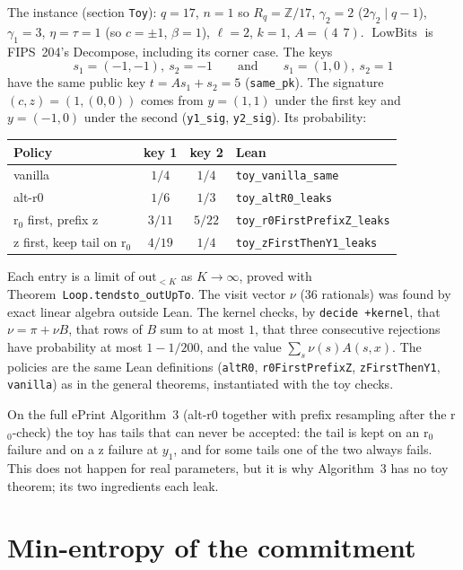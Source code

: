\documentclass[11pt]{article}
\theoremstyle{definition}
\theoremstyle{remark}
\newcommand{\Z}{\mathbb{Z}}
\newcommand{\lowbits}{\operatorname{LowBits}}
\newcommand{\lean}[1]{\texttt{#1}}
\begin{document}
The instance (section \lean{Toy}): $q=17$, $n=1$ so $R_q = \Z/17$, $\gamma_2 = 2$
($2\gamma_2 \mid q-1$), $\gamma_1 = 3$, $\eta=\tau=1$ (so $c=\pm1$, $\beta = 1$), $\ell=2$,
$k=1$, $A = (4\ \ 7)$. $\lowbits$ is FIPS~204's \textsf{Decompose}, including its corner case.
The keys
\[
  s_1 = (-1,-1),\ s_2 = -1 \qquad\text{and}\qquad s_1 = (1,0),\ s_2 = 1
\]
have the same public key $t = As_1 + s_2 = 5$ (\lean{same\_pk}). The signature
$(c,z) = (1,(0,0))$ comes from $y=(1,1)$ under the first key and $y=(-1,0)$ under the second
(\lean{y1\_sig}, \lean{y2\_sig}). Its probability:

\begin{center}
\begin{tabular}{@{}lccl@{}}
\toprule
Policy & key 1 & key 2 & Lean\\
\midrule
vanilla & $1/4$ & $1/4$ & \lean{toy\_vanilla\_same}\\
alt-r0 & $1/6$ & $1/3$ & \lean{toy\_altR0\_leaks}\\
r$_0$ first, prefix z & $3/11$ & $5/22$ & \lean{toy\_r0FirstPrefixZ\_leaks}\\
z first, keep tail on r$_0$ & $4/19$ & $1/4$ & \lean{toy\_zFirstThenY1\_leaks}\\
\bottomrule
\end{tabular}
\end{center}

Each entry is a limit of $\mathrm{out}_{<K}$ as $K\to\infty$, proved with
Theorem~\lean{Loop.tendsto\_outUpTo}. The visit vector $\nu$ (36 rationals) was found by exact
linear algebra outside Lean. The kernel checks, by \lean{decide +kernel}, that $\nu = \pi + \nu B$,
that rows of $B$ sum to at most $1$, that three consecutive rejections have probability at most
$1 - 1/200$, and the value $\sum_s \nu(s)A(s,x)$. The policies are the same Lean definitions
(\lean{altR0}, \lean{r0FirstPrefixZ}, \lean{zFirstThenY1}, \lean{vanilla}) as in the general
theorems, instantiated with the toy checks.

On the full ePrint Algorithm~3 (alt-r0 together with prefix resampling after the r$_0$-check)
the toy has tails that can never be accepted: the tail is kept on an r$_0$ failure and on a z
failure at $y_1$, and for some tails one of the two always fails. This does not happen for real
parameters, but it is why Algorithm~3 has no toy theorem; its two ingredients each leak.

\section{Min-entropy of the commitment}\label{sec:minentropy}
\end{document}
